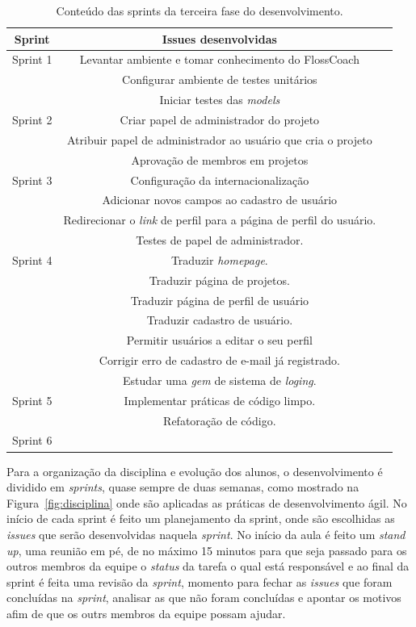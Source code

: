 \begin{table}[h]
	\centering
	\begin{tabular}{ccc}
		\toprule
		\textbf{Sprint} & \textbf{Issues desenvolvidas} \\
		\midrule
		Sprint 1 & Levantar ambiente e tomar conhecimento do FlossCoach \\
			 & Configurar ambiente de testes unitários \\
			 & Iniciar testes das \textit{models}\\
		\midrule
		Sprint 2 & Criar papel de administrador do projeto\\
			 & Atribuir papel de administrador ao usuário que cria o projeto \\
			 & Aprovação de membros em projetos \\
		\midrule		
		Sprint 3 & Configuração da internacionalização \\
			 & Adicionar novos campos ao cadastro de usuário\\
			 & Redirecionar o \textit{link} de perfil para a página de perfil do usuário.\\
			 & Testes de papel de administrador.\\
		\midrule		
		Sprint 4 & Traduzir \textit{homepage}.\\
			 & Traduzir página de projetos.\\
			 & Traduzir página de perfil de usuário\\
			 & Traduzir cadastro de usuário.\\ 
			 & Permitir usuários a editar o seu perfil\\
			 & Corrigir erro de cadastro de e-mail já registrado.\\
			 & Estudar uma \textit{gem} de sistema de \textit{loging}.\\  
		\midrule		
		Sprint 5 & Implementar práticas de código limpo.\\
			 & Refatoração de código.\\
	
		\midrule
		Sprint 6 &\\
		\bottomrule
	\end{tabular}

	\caption{Conteúdo das sprints da terceira fase do desenvolvimento.}
	\label{issues}
\end{table}

Para a organização da disciplina e evolução dos alunos, o desenvolvimento é dividido
em \textit{sprints}, quase sempre de duas semanas, como mostrado na Figura~\ref{fig:disciplina}
onde são aplicadas as práticas de desenvolvimento ágil. No início de cada sprint é feito um planejamento da sprint, 
onde são escolhidas as \textit{issues} que serão desenvolvidas naquela \textit{sprint}.
No início da aula é feito um \textit{stand up}, uma reunião em pé, de no máximo 15
minutos para que seja passado para os outros membros da equipe o \textit{status} da
tarefa o qual está responsável e ao final da sprint é feita uma revisão da \textit{sprint},
momento para fechar as \textit{issues} que foram concluídas na \textit{sprint}, 
analisar as que não foram concluídas e apontar os motivos afim de que os outrs membros
da equipe possam ajudar.

